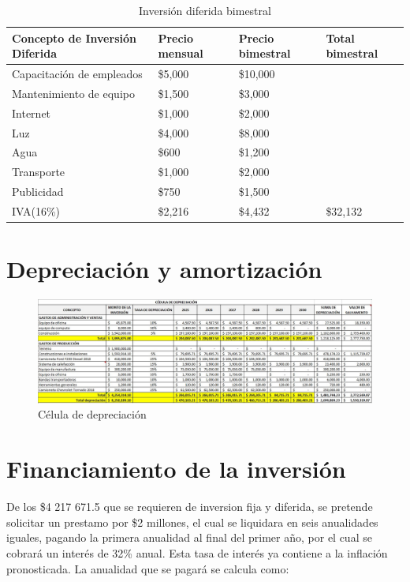\begin{table}[h]
    \centering
    \caption{Inversión diferida bimestral}
    \begin{tabular}{p{5cm} || p{2cm} || p{3cm} || p{3cm}}
        \toprule
        \textbf{Concepto de Inversión Diferida} & \textbf{Precio mensual} & \textbf{Precio bimestral} & \textbf{Total bimestral}\\
        \midrule
        Capacitación de empleados & \$5,000 &\$10,000 &\\
        Mantenimiento de equipo & \$1,500 & \$3,000&\\
        Internet & \$1,000 & \$2,000&\\
        Luz & \$4,000 & \$8,000&\\
        Agua & \$600 & \$1,200 &\\
        Transporte & \$1,000 & \$2,000 &\\
        Publicidad & \$750 & \$1,500 &\\
        \hline
        IVA(16\%) & \$2,216 & \$4,432 & \$32,132\\
        \bottomrule
    \end{tabular}
\end{table}




\section{Depreciación y amortización}

\begin{figure}[H]
    \centering	
    \includegraphics[width=1.1\textwidth]{chapters/ELC_10.png} 
    \caption{Célula de depreciación}
\label{fig:croquis190125}
\end{figure}



\section{Financiamiento de la inversión}

De los \$4 217 671.5 que se requieren de inversion fija y diferida, se pretende solicitar un prestamo por \$2 millones, el cual se liquidara en seis anualidades iguales, pagando la primera anualidad al final del primer año, por el cual se cobrará un interés de 32\% anual. Esta tasa de interés ya contiene a la inflación pronosticada. La anualidad que se pagará se calcula como:

